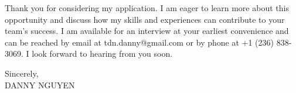 \documentclass[letterpaper,11pt]{article}
\begin{document}
Thank you for considering my application. I am eager to learn more about this opportunity and discuss how my skills and experiences can contribute to your team's success. I am available for an interview at your earliest convenience and can be reached by email at tdn.danny@gmail.com or by phone at +1 (236) 838-3069. I look forward to hearing from you soon.
\vspace{20pt}

Sincerely, \\
\vspace{40pt} %
DANNY NGUYEN
\end{document}

